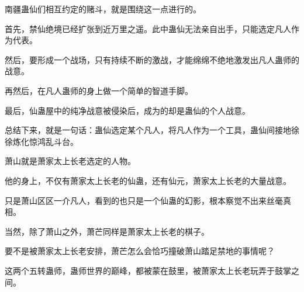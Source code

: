 \begin{this_body}
南疆蛊仙们相互约定的赌斗，就是围绕这一点进行的。

首先，禁仙绝境已经扩张到近万里之遥。此中蛊仙无法亲自出手，只能选定凡人作为代表。

然后，要形成一个战场，只有持续不断的激战，才能绵绵不绝地激发出凡人蛊师的战意。

再然后，在凡人蛊师的身上做一个简单的智道手脚。

最后，仙蛊屋中的纯净战意被侵染后，成为的却是蛊仙的个人战意。

总结下来，就是一句话：蛊仙选定某个凡人，将凡人作为一个工具，蛊仙间接地徐徐炼化惊鸿乱斗台。

萧山就是萧家太上长老选定的人物。

他的身上，不仅有萧家太上长老的仙蛊，还有仙元，萧家太上长老的大量战意。

只是萧山区区一介凡人，看到的也只是一个仙蛊的幻影，根本察觉不出来丝毫真相。

当然，除了萧山之外，萧芒同样是萧家太上长老的棋子。

要不是被萧家太上长老安排，萧芒怎么会恰巧撞破萧山踏足禁地的事情呢？

这两个五转蛊师，蛊师世界的巅峰，都被蒙在鼓里，被萧家太上长老玩弄于鼓掌之间。

\end{this_body}

